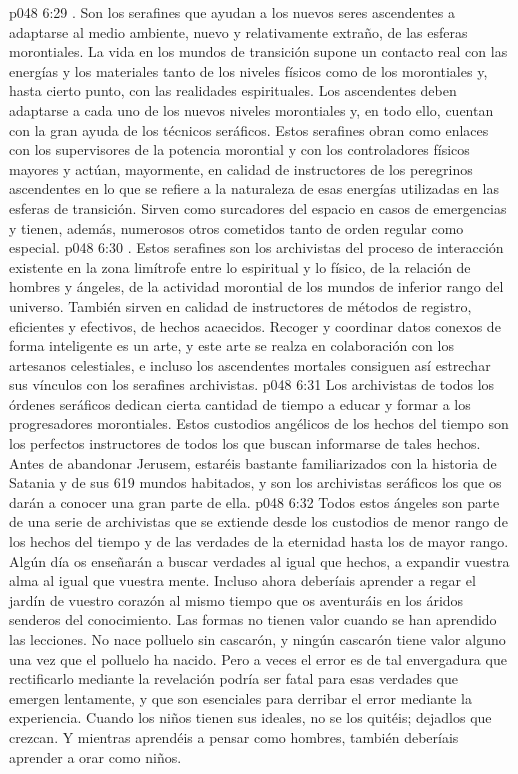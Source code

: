 \vs p048 6:29 . Son los serafines que ayudan a los nuevos seres ascendentes a adaptarse al medio ambiente, nuevo y relativamente extraño, de las esferas morontiales. La vida en los mundos de transición supone un contacto real con las energías y los materiales tanto de los niveles físicos como de los morontiales y, hasta cierto punto, con las realidades espirituales. Los ascendentes deben adaptarse a cada uno de los nuevos niveles morontiales y, en todo ello, cuentan con la gran ayuda de los técnicos seráficos. Estos serafines obran como enlaces con los supervisores de la potencia morontial y con los controladores físicos mayores y actúan, mayormente, en calidad de instructores de los peregrinos ascendentes en lo que se refiere a la naturaleza de esas energías utilizadas en las esferas de transición. Sirven como surcadores del espacio en casos de emergencias y tienen, además, numerosos otros cometidos tanto de orden regular como especial.
\vs p048 6:30 . Estos serafines son los archivistas del proceso de interacción existente en la zona limítrofe entre lo espiritual y lo físico, de la relación de hombres y ángeles, de la actividad morontial de los mundos de inferior rango del universo. También sirven en calidad de instructores de métodos de registro, eficientes y efectivos, de hechos acaecidos. Recoger y coordinar datos conexos de forma inteligente es un arte, y este arte se realza en colaboración con los artesanos celestiales, e incluso los ascendentes mortales consiguen así estrechar sus vínculos con los serafines archivistas.
\vs p048 6:31 Los archivistas de todos los órdenes seráficos dedican cierta cantidad de tiempo a educar y formar a los progresadores morontiales. Estos custodios angélicos de los hechos del tiempo son los perfectos instructores de todos los que buscan informarse de tales hechos. Antes de abandonar Jerusem, estaréis bastante familiarizados con la historia de Satania y de sus 619 mundos habitados, y son los archivistas seráficos los que os darán a conocer una gran parte de ella.
\vs p048 6:32 Todos estos ángeles son parte de una serie de archivistas que se extiende desde los custodios de menor rango de los hechos del tiempo y de las verdades de la eternidad hasta los de mayor rango. Algún día os enseñarán a buscar verdades al igual que hechos, a expandir vuestra alma al igual que vuestra mente. Incluso ahora deberíais aprender a regar el jardín de vuestro corazón al mismo tiempo que os aventuráis en los áridos senderos del conocimiento. Las formas no tienen valor cuando se han aprendido las lecciones. No nace polluelo sin cascarón, y ningún cascarón tiene valor alguno una vez que el polluelo ha nacido. Pero a veces el error es de tal envergadura que rectificarlo mediante la revelación podría ser fatal para esas verdades que emergen lentamente, y que son esenciales para derribar el error mediante la experiencia. Cuando los niños tienen sus ideales, no se los quitéis; dejadlos que crezcan. Y mientras aprendéis a pensar como hombres, también deberíais aprender a orar como niños.
